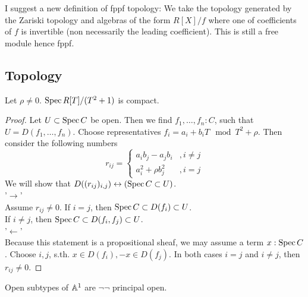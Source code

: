 \documentclass{article}
\begin{document}
\begin{example}
	I suggest a new definition of fppf topology: We take the topology generated by the Zariski topology and algebras of the form $R[X] / f$ where one of coefficients of $f$ is invertible (non necessarily the leading coefficient). This is still a free module hence fppf. \\
\end{example}
\subsection{Topology}
\begin{lemma}
	Let $\rho \neq 0$.
	$\operatorname{Spec} R[T] / (T^2 + 1)$  is compact.
\end{lemma}
\begin{proof}
	Let $U \subset \operatorname{Spec} C$ be open. Then we find $f_1,\hdots,f_n :C$, such that
	$U = D(f_1,\hdots,f_n)$.
	Choose representatives $f_i = a_i + b_iT \mod T^2 + \rho$.
	Then consider the following numbers 
	\[
	r_{ij} = \begin{cases} a_i b_j - a_j b_i  &, i \neq j \\ a_i^2 + \rho b_j^2 &, i = j \end{cases}
	\]
	We will show that $D((r_{ij})_{i,j}) \leftrightarrow (\operatorname{Spec} C \subset U)$. \\
	'$\rightarrow$' \\
	Assume $r_{ij} \neq 0$. If $i = j$, then $\operatorname{Spec} C \subset D(f_i) \subset U$. \\
	If $i \neq j$, then $\operatorname{Spec} C \subset D(f_i,f_j) \subset U$. \\
	'$\leftarrow$' \\
	Because this statement is a propositional sheaf, we may assume a term $x : \operatorname{Spec} C$. Choose $i,j$, s.th. $x \in D(f_i), -x \in D(f_j)$. In both cases $i = j$ and $i \neq j$, then $r_{ij} \neq 0$. 
\end{proof}
\begin{lemma}
	Open subtypes of $\mathbb{A}^1$ are $\lnot \lnot$ principal open. %
\end{lemma}
\end{document}
